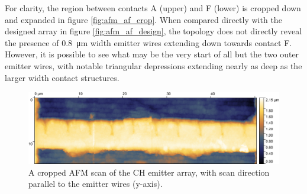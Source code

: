 \begin{refsection}
For clarity, the region between contacts A (upper) and F (lower) is cropped down and expanded in figure \ref{fig:afm_af_crop}. When compared directly with the designed array in figure \ref{fig:afm_af_design}, the topology does not directly reveal the presence of 0.8~\si{\micro\metre} width emitter wires extending down towards contact F. However, it is possible to see what may be the very start of all but the two outer emitter wires, with notable triangular depressions extending nearly as deep as the larger width contact structures.

\begin{figure}[H]
    \centering
    \includegraphics[width=\textwidth]{Chapter7/Figs/Raster/CH_cropped.jpg}
    \caption{A cropped AFM scan of the CH emitter array, with scan direction parallel to the emitter wires (y-axis).}
    \label{fig:afm_ch_array}
\end{figure}


\end{refsection}
